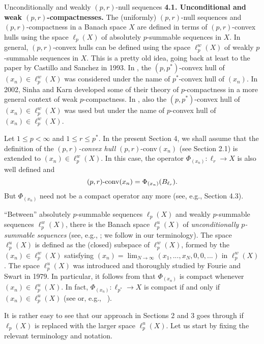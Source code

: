 \documentclass[a4paper,11pt]{amsart}
\theoremstyle{definition}
\theoremstyle{definition}
\theoremstyle{definition}
\begin{document}
\begin{section}{Unconditionally and weakly ${{(p,r)}}$-null sequences}
{\bf 4.1. Unconditional and weak ${{(p,r)}}$-compactnesses.} The (uniformly) ${{(p,r)}}$-null sequences and ${{(p,r)}}$-compactness in a Banach space $X$ are defined in terms of ${{(p,r)}}$-convex hulls using the space $\ell_p(X)$ of absolutely $p$-summable sequences in $X$. In general, ${{(p,r)}}$-convex hulls can be defined using the space $\ell_p ^w(X)$ of weakly $p$-summable sequences in $X$. This is a pretty old idea, going back at least to the paper \cite[p.~51]{CSa} by Castillo and Sanchez in 1993. In \cite{CSa}, the $(p,{p^{\ast}})$-convex hull of $(x_n)\in \ell_p^w(X)$ was considered under the name of ${p^{\ast}}$-convex hull of $(x_n)$. In 2002, Sinha and Karn \cite{SK1} developed some of their theory of $p$-compactness in a more general context of weak $p$-compactness. In \cite{SK1}, also the $(p,{p^{\ast}})$-convex hull of $(x_n)\in \ell_p^w(X)$ was used but under the name of $p$-convex hull of $(x_n)\in \ell_p^w(X)$.

Let $1\leq p <\infty$ and $1 \leq r \leq {p^{\ast}}$. In the present Section 4, we shall assume that  the definition of the \emph{${{(p,r)}}$-convex hull} ${{(p,r)}}$-conv$(x_n)$ (see Section 2.1) is extended to $(x_n)\in \ell_p^w(X)$. In this case, the operator $\Phi _{(x_n)}: \ell_r {\rightarrow} X$ is also well defined and 
\[
(p,r)\textnormal{-conv}(x_n)=\Phi _{(x_n)}(B_{\ell_r}).
\]
But $\Phi_{(x_n)}$ need not be a compact operator any more (see, e.g., Section 4.3).

``Between'' absolutely $p$-summable sequences $\ell_p(X)$ and weakly $p$-summable sequences $\ell_p^w(X)$, there is the Banach space $\ell_p^u(X)$ of \emph{unconditionally $p$-summable sequences} (see, e.g., \cite[8.2,~8.3]{DF}; we follow \cite{BCFP} in our terminology). The space $\ell_p^u(X)$ is defined as the (closed) subspace of $\ell_p^w(X)$, formed by the $(x_n)\in \ell_p^w(X)$ satisfying $(x_n)= \lim _{N{\rightarrow} \infty}(x_1, ... , x_N, 0,0,...)$ in $\ell_p^w(X)$. The space $\ell_p^u(X)$ was introduced and thoroughly studied by Fourie and Swart \cite{FS1} in 1979. In particular, it follows from \cite[Theorem~1.4]{FS1} that $\Phi _{(x_n)}$ is compact whenever $(x_n)\in \ell_p^u(X)$. In fact, $\Phi _{(x_n)}: \ell_{p^{\ast}} {\rightarrow} X$ is compact if and only if $(x_n)\in \ell_p^u(X)$ (see \cite[Theorem~1.4]{FS1} or, e.g., ~\cite[8.2]{DF}). 

It is rather easy to see that our approach in Sections 2 and 3 goes through if $\ell_p(X)$ is replaced with the larger space $\ell_p^u(X)$. Let us start by fixing the relevant terminology and notation.


\end{section}
\end{document}
